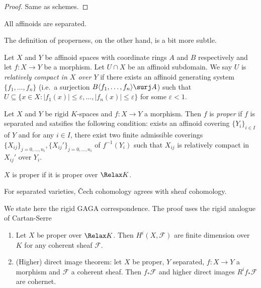 \documentclass[a4paper]{article}
\newcommand{\sh}[1]{\mathcal{#1}} %
\let\Sp\Relax
\DeclareMathOperator{\Sp}{Sp} %
\begin{document}
\begin{proof}
  Same as schemes.
\end{proof}

\begin{eg}
  All affinoids are separated.
\end{eg}

The definition of properness, on the other hand, is a bit more subtle.

\begin{definition}
  Let \(X\) and \(Y\) be affinoid spaces with coordinate rings \(A\) and \(B\) respectively and let \(f: X \to Y\) be a morphism. Let \(U \cap X\) be an affinoid subdomain. We say \(U\) is \emph{relatively compact in \(X\) over \(Y\)} if there exists an affinoid generating system \(\{f_1, \dots, f_n\}\) (i.e.\ a surjection \(B \langle f_1, \dots, f_n \rangle \surj A\)) such that \(U \subseteq \{x \in X: |f_1(x)| \leq \varepsilon, \dots, |f_n(x)| \leq \varepsilon\}\) for some \(\varepsilon < 1\).
\end{definition}

\begin{definition}[proper]
  Let \(X\) and \(Y\) be rigid \(K\)-spaces and \(f: X \to Y\) a morphism. Then \(f\) is \emph{proper} if \(f\) is separated and satsifies the following condition: exists an affinoid covering \(\{Y_i\}_{i \in I}\) of \(Y\) and for any \(i \in I\), there exist two finite admissible coverings \(\{X_{ij}\}_{j = 0, \dots, n_i}, \{X_{ij}'\}_{j = 0, \dots, n_i}\) of \(f^{-1}(Y_i)\) such that \(X_{ij}\) is relatively compact in \(X_{ij}'\) over \(Y_i\).

  \(X\) is proper if it is proper over \(\Sp K\).
\end{definition}

For separated varieties, Čech cohomology agrees with sheaf cohomology.

We state here the rigid GAGA correspondence. The proof uses the rigid analogue of Cartan-Serre

\begin{theorem}[Khiel]\leavevmode
  \begin{enumerate}
  \item Let \(X\) be proper over \(\Sp K\). Then \(H^i(X, \sh F)\) are finite dimension over \(K\) for any coherent sheaf \(\sh F\).
  \item (Higher) direct image theorem: let \(X\) be proper, \(Y\) separated, \(f: X \to Y\) a morphism and \(\sh F\) a coherent sheaf. Then \(f_* \sh F\) and higher direct images \(R^if_* \sh F\) are cohernet.
  \end{enumerate}
\end{theorem}
\end{document}
